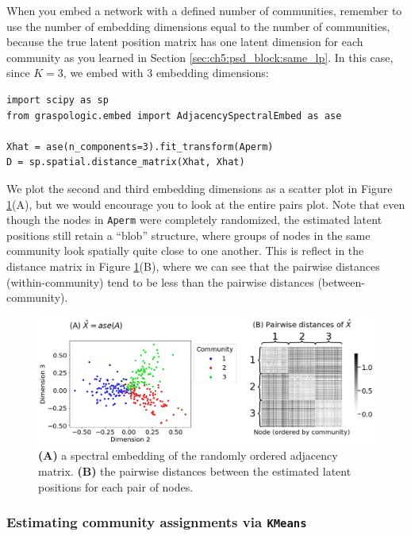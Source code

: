 When you embed a network with a defined number of communities, remember to use the number of embedding dimensions equal to the number of communities, because the true latent position matrix has one latent dimension for each community as you learned in Section \ref{sec:ch5:psd_block:same_lp}. In this case, since $K=3$, we embed with $3$ embedding dimensions:

\begin{lstlisting}[style=python]
import scipy as sp
from graspologic.embed import AdjacencySpectralEmbed as ase

Xhat = ase(n_components=3).fit_transform(Aperm)
D = sp.spatial.distance_matrix(Xhat, Xhat)
\end{lstlisting}
We plot the second and third embedding dimensions as a scatter plot in Figure \ref{fig:ch7:comm_detect:embed}(A), but we would encourage you to look at the entire pairs plot. Note that even though the nodes in \texttt{Aperm} were completely randomized, the estimated latent positions still retain a ``blob'' structure, where groups of nodes in the same community look spatially quite close to one another. This is reflect in the distance matrix in Figure \ref{fig:ch7:comm_detect:embed}(B), where we can see that the pairwise distances (within-community) tend to be less than the pairwise distances (between-community).


\begin{figure}[h]
    \centering
    \includegraphics[width=\linewidth]{applications/ch7/Images/comm_detect_embed.png}
    \caption[Community detection spectral embedding and pairwise distances]{\textbf{(A)} a spectral embedding of the randomly ordered adjacency matrix. \textbf{(B)} the pairwise distances between the estimated latent positions for each pair of nodes.}
    \label{fig:ch7:comm_detect:embed}
\end{figure}

\subsubsection{Estimating community assignments via \texttt{KMeans}}

